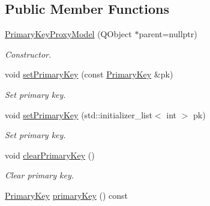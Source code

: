 \subsection*{Public Member Functions}
\begin{DoxyCompactItemize}
\item 
\hyperlink{class_mdt_1_1_item_model_1_1_primary_key_proxy_model_a38f37907461e93ff3b495913670a81e4}{Primary\+Key\+Proxy\+Model} (Q\+Object $\ast$parent=nullptr)\hypertarget{class_mdt_1_1_item_model_1_1_primary_key_proxy_model_a38f37907461e93ff3b495913670a81e4}{}\label{class_mdt_1_1_item_model_1_1_primary_key_proxy_model_a38f37907461e93ff3b495913670a81e4}

\begin{DoxyCompactList}\small\item\em Constructor. \end{DoxyCompactList}\item 
void \hyperlink{class_mdt_1_1_item_model_1_1_primary_key_proxy_model_aed611b08855628db7297f248f3ad8816}{set\+Primary\+Key} (const \hyperlink{class_mdt_1_1_item_model_1_1_primary_key}{Primary\+Key} \&pk)
\begin{DoxyCompactList}\small\item\em Set primary key. \end{DoxyCompactList}\item 
void \hyperlink{class_mdt_1_1_item_model_1_1_primary_key_proxy_model_a1fa9584b2fe20bc28f4b47c57edfa91a}{set\+Primary\+Key} (std\+::initializer\+\_\+list$<$ int $>$ pk)
\begin{DoxyCompactList}\small\item\em Set primary key. \end{DoxyCompactList}\item 
void \hyperlink{class_mdt_1_1_item_model_1_1_primary_key_proxy_model_a95a892702cc0c47d615eb6c6b05d712b}{clear\+Primary\+Key} ()\hypertarget{class_mdt_1_1_item_model_1_1_primary_key_proxy_model_a95a892702cc0c47d615eb6c6b05d712b}{}\label{class_mdt_1_1_item_model_1_1_primary_key_proxy_model_a95a892702cc0c47d615eb6c6b05d712b}

\begin{DoxyCompactList}\small\item\em Clear primary key. \end{DoxyCompactList}\item 
\hyperlink{class_mdt_1_1_item_model_1_1_primary_key}{Primary\+Key} \hyperlink{class_mdt_1_1_item_model_1_1_primary_key_proxy_model_af3b426523a13e8ef45bdd2fcc94c0c4d}{primary\+Key} () const \hypertarget{class_mdt_1_1_item_model_1_1_primary_key_proxy_model_af3b426523a13e8ef45bdd2fcc94c0c4d}{}\label{class_mdt_1_1_item_model_1_1_primary_key_proxy_model_af3b426523a13e8ef45bdd2fcc94c0c4d}


\end{DoxyCompactItemize}
